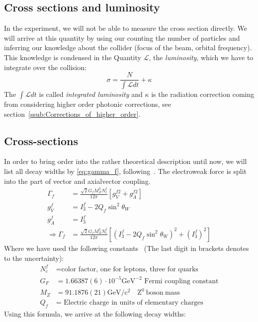 \subsection{Cross sections and luminosity}
In the experiment, we will not be able to measure the cross section directly. We will arrive at this quantity by using our
counting the number of particles and inferring our knowledge about the collider (focus of the beam, orbital frequency). This
knowledge is condensed in the Quantity $\mathcal{L}$, the \textit{luminosity}, which we have to integrate over the collision:
\begin{equation}
    \sigma = \frac{N}{\int \mathcal{L} dt} + \kappa
\end{equation}
The $\int \mathcal{L} dt$ is called \textit{integrated luminosity} and $\kappa$ is the radiation correction coming from 
considering higher order photonic corrections, see section~\ref{ssub:Corrections_of_higher_order}.
\subsection{Cross-sections}
\label{sub:cross_sections}
In order to bring order into the rather theoretical description until now, we will list all decay widths by \eqref{eq:gamma_f},
following~\cite{ver}.
The electroweak force is split into the part of vector and axialvector coupling. 
\begin{align*}
    \Gamma_f &= \frac{\sqrt{2} G_f M_Z^3 N_c^f}{12 \pi} \left[ g_V^{f2} + g_A^{f2} \right] \\
       g_V^f &= I_3^f - 2 Q_f \sin^2 \theta_W \\
       g_A^f &= I_3^f \\
\Rightarrow \Gamma_f &= \frac{\sqrt{2} G_f M_Z^3 N_c^f}{12 \pi} \left[ (I_3^f - 2 Q_f \sin^2 \theta_W)^2 + (I_3^f)^2  \right] 
\end{align*}
Where we have used the following constants~\cite{pdg} (The last digit in brackets denotes to the uncertainty):
\begin{align*}
\label{eq:consts}
    N_c^f &= \text{color factor, one for leptons, three for quarks}  \\
    G_F &= 1.66387(6) \cdot 10^{-5} \mathrm{GeV^{-2}} \text{ Fermi coupling constant} \\
    M_Z &= 91.1876(21) \mathrm{GeV /c^{2}} \quad \mathrm{Z^0 \: boson \: mass} \\
    Q_f &= \text{ Electric charge in units of elementary charges}
\end{align*}
Using this formula, we arrive at the following decay widths:

